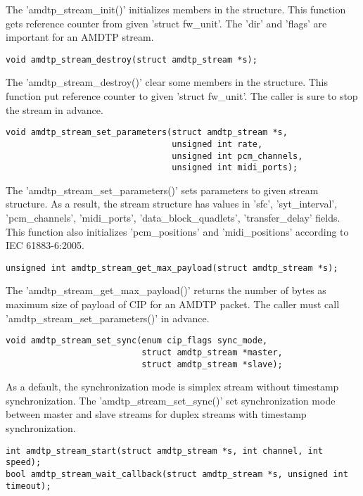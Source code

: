 \documentclass[onecolumn]{jarticle}
\begin{document}
The 'amdtp\_stream\_init()' initializes members in the structure. This function gets reference counter from given 'struct fw\_unit'. The 'dir' and 'flags' are important for an AMDTP stream.

\begin{verbatim}
void amdtp_stream_destroy(struct amdtp_stream *s);
\end{verbatim}

The 'amdtp\_stream\_destroy()' clear some members in the structure. This function put reference counter to given 'struct fw\_unit'. The caller is sure to stop the stream in advance.

\begin{verbatim}
void amdtp_stream_set_parameters(struct amdtp_stream *s,
                                 unsigned int rate,
                                 unsigned int pcm_channels,
                                 unsigned int midi_ports);
\end{verbatim}

The 'amdtp\_stream\_set\_parameters()' sets parameters to given stream structure. As a result, the stream structure has values in 'sfc', 'syt\_interval', 'pcm\_channels', 'midi\_ports', 'data\_block\_quadlets', 'transfer\_delay' fields. This function also initializes 'pcm\_positions' and 'midi\_positions' according to IEC 61883-6:2005.

\begin{verbatim}
unsigned int amdtp_stream_get_max_payload(struct amdtp_stream *s);
\end{verbatim}

The 'amdtp\_stream\_get\_max\_payload()' returns the number of bytes as maximum size of payload of CIP for an AMDTP packet. The caller must call 'amdtp\_stream\_set\_parameters()' in advance.

\begin{verbatim}
void amdtp_stream_set_sync(enum cip_flags sync_mode,
                           struct amdtp_stream *master,
                           struct amdtp_stream *slave);
\end{verbatim}

As a default, the synchronization mode is simplex stream without timestamp synchronization. The 'amdtp\_stream\_set\_sync()' set synchronization mode between master and slave streams for duplex streams with timestamp synchronization.

\begin{verbatim}
int amdtp_stream_start(struct amdtp_stream *s, int channel, int speed);
bool amdtp_stream_wait_callback(struct amdtp_stream *s, unsigned int timeout);
\end{verbatim}
\end{document}
